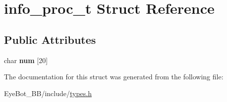 \hypertarget{structinfo__proc__t}{\section{info\-\_\-proc\-\_\-t \-Struct \-Reference}
\label{structinfo__proc__t}
}
\subsection*{\-Public \-Attributes}
\begin{DoxyCompactItemize}
\item 
\hypertarget{structinfo__proc__t_ac2ef1821a1e27f52432b93968b87795c}{char {\bfseries num} \mbox{[}20\mbox{]}}\label{structinfo__proc__t_ac2ef1821a1e27f52432b93968b87795c}

\end{DoxyCompactItemize}


\-The documentation for this struct was generated from the following file\-:\begin{DoxyCompactItemize}
\item 
\-Eye\-Bot\-\_\-\-B\-B/include/\hyperlink{types_8h}{types.\-h}\end{DoxyCompactItemize}
